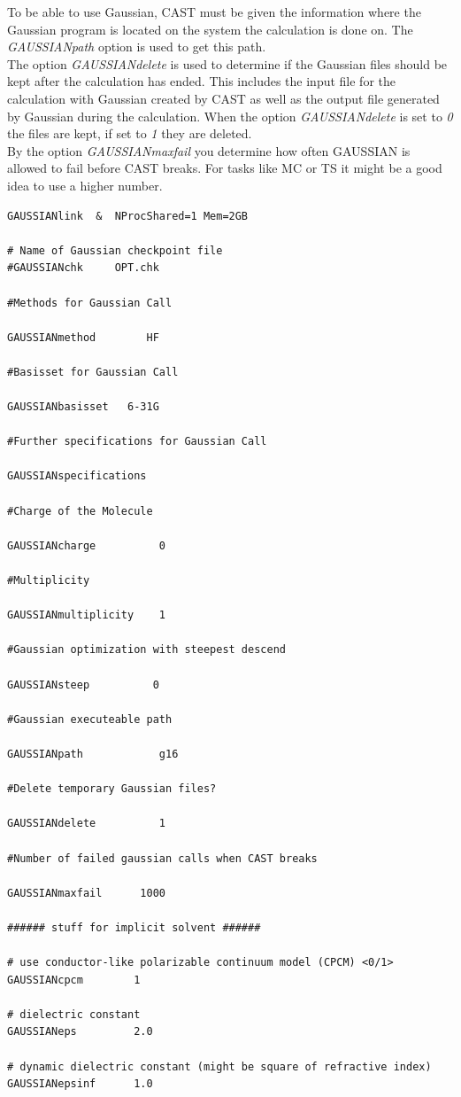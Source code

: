 \documentclass[10pt,a4paper]{article} %
\begin{document}
To be able to use Gaussian, CAST must be given the information where the Gaussian program is located on the system the calculation is done on. The \textit{GAUSSIANpath} option is used to get this path.\\
The option \textit{GAUSSIANdelete} is used to determine if the Gaussian files should be kept after the calculation has ended. This includes the input file for the calculation with Gaussian created by CAST as well as the output file generated by Gaussian during the calculation. When the option \textit{GAUSSIANdelete} is set to \textit{0} the files are kept, if set to \textit{1} they are deleted.\\
By the option \textit{GAUSSIANmaxfail} you determine how often GAUSSIAN is allowed to fail before CAST breaks. For tasks like MC or TS it might be a good idea to use a higher number.\\
\begin{lstlisting}
GAUSSIANlink  &  NProcShared=1 Mem=2GB

# Name of Gaussian checkpoint file
#GAUSSIANchk     OPT.chk

#Methods for Gaussian Call

GAUSSIANmethod        HF

#Basisset for Gaussian Call

GAUSSIANbasisset   6-31G   

#Further specifications for Gaussian Call

GAUSSIANspecifications 

#Charge of the Molecule

GAUSSIANcharge          0

#Multiplicity 

GAUSSIANmultiplicity    1

#Gaussian optimization with steepest descend 

GAUSSIANsteep          0

#Gaussian executeable path 

GAUSSIANpath            g16

#Delete temporary Gaussian files?

GAUSSIANdelete          1

#Number of failed gaussian calls when CAST breaks

GAUSSIANmaxfail      1000

###### stuff for implicit solvent ######

# use conductor-like polarizable continuum model (CPCM) <0/1>
GAUSSIANcpcm        1

# dielectric constant 
GAUSSIANeps         2.0

# dynamic dielectric constant (might be square of refractive index)
GAUSSIANepsinf      1.0
\end{lstlisting}
\end{document}
